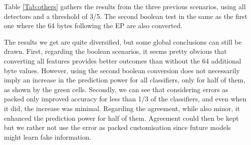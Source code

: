 \begin{itemize}
    Table \ref{Tab:others} gathers the results from the three previous scenarios, using all detectors and a threshold of 3/5. The second boolean test in the same as the first one where the 64 bytes following the EP are also converted.
    \begin{table}[H]
    \centering
    \captionsetup{justification=centering}
    \caption{Tests over datasets generated with boolean values, error as packed and agreement}
    \label{Tab:others}
    \end{table}
    The results we get are quite diversified, but some global conclusions can still be drawn. First, regarding the boolean scenarios, it seems pretty obvious that converting all features provides better outcomes than without the 64 additional byte values. However, using the second boolean conversion does not necessarily imply an increase in the prediction power for all classifiers, only for half of them, as shown by the green cells. Secondly, we can see that considering errors as packed only improved accuracy for less than 1/3 of the classifiers, and even when it did, the increase was minimal. Regarding the agreement, while also minor, it enhanced the prediction power for half of them. Agreement could then be kept but we rather not use the error as packed customisation since future models might learn fake information.
    

\end{itemize}
